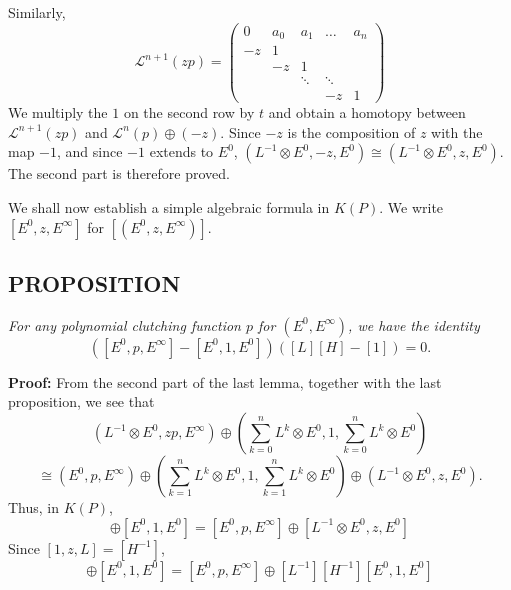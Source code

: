 Similarly,
\begin{equation*}
    \mathcal{L}^{n+1}(zp) =
    \begin{pmatrix}
        0   & a_0 & a_1 & \ldots & a_n \\
        -z  &  1  &     &        &     \\
            & -z  &  1  &        &     \\
            &     &\ddots& \ddots&     \\
            &     &     &   -z   &  1
    \end{pmatrix}
\end{equation*}
We multiply the $1$ on the second row by $t$ and obtain a homotopy between $\mathcal{L}^{n+1}(zp)$ and $\mathcal{L}^n(p) \oplus (-z)$. Since $-z$ is the composition of $z$ with the map $-1$, and since $-1$ extends to $E^0$, $(L^{-1} \otimes E^0, -z, E^0) \cong (L^{-1} \otimes E^0, z, E^0)$. The second part is therefore proved. \par 

We shall now establish a simple algebraic formula in $K(P)$. We write $[E^0, z, E^\infty]$ for $[(E^0, z, E^\infty)]$.

\subsection{PROPOSITION}\label{pro:2.2.7} \textit{For any polynomial clutching function $p$ for $(E^0, E^\infty)$, we have the identity}
\begin{equation*}
    ([E^0, p, E^\infty] - [E^0, 1, E^0])([L][H] - [1]) = 0.
\end{equation*} \par 

\textbf{Proof:} From the second part of the last lemma, together with the last proposition, we see that
\begin{equation*}
    (L^{-1} \otimes E^0, zp, E^\infty) \oplus \left( \sum_{k = 0}^n L^k \otimes E^0, 1, \sum_{k = 0}^n L^k \otimes E^0  \right)
\end{equation*}
\begin{equation*}
    \cong (E^0, p, E^\infty) \oplus \left( \sum_{k = 1}^n L^k \otimes E^0, 1, \sum_{k = 1}^n L^k \otimes E^0  \right) \oplus (L^{-1} \otimes E^0, z, E^0) .
\end{equation*}
Thus, in $K(P)$,
\begin{equation*}
    [L^{-1} \otimes E^0, zp, E^\infty] \oplus [E^0, 1, E^0] = [E^0, p, E^\infty] \oplus [L^{-1} \otimes E^0, z, E^0]
\end{equation*}
Since $[1, z, L] = [H^{-1}]$,
\begin{equation*}
    [L^{-1}][H^{-1}][E^0, p, E^\infty] \oplus [E^0, 1, E^0] = [E^0, p, E^\infty] \oplus [L^{-1}][H^{-1}][E^0, 1, E^0]
\end{equation*} \par 

